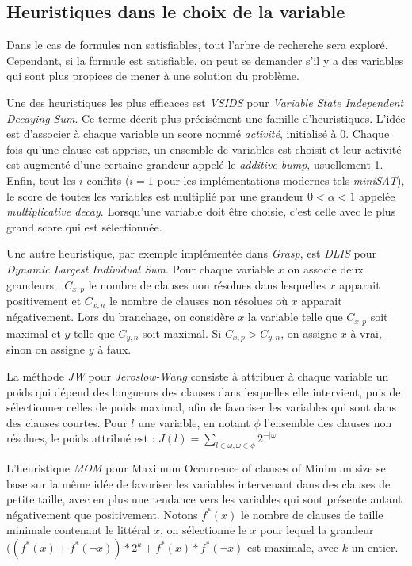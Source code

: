 \subsection{Heuristiques dans le choix de la variable}\label{decision}
Dans le cas de formules non satisfiables, tout l'arbre de recherche sera
exploré. Cependant, si la formule est satisfiable, on peut se demander s'il
y a des variables qui sont plus propices de mener à une solution du problème.

Une des heuristiques les plus efficaces est \emph{VSIDS} pour \emph{Variable
State Independent Decaying Sum}. Ce terme décrit plus précisément une famille
d'heuristiques. L'idée est d'associer à chaque variable un score nommé
\emph{activité}, initialisé à $0$. Chaque fois qu'une clause est apprise,
un ensemble de variables est choisit et leur activité est augmenté d'une
certaine grandeur appelé le \emph{additive bump}, usuellement 1. Enfin, tout
les $i$ conflits ($i=1$ pour les implémentations modernes tels \emph{miniSAT}),
le score de toutes les variables est multiplié par une grandeur
$0 < \alpha < 1$ appelée \emph{multiplicative decay}. Lorsqu'une variable doit
être choisie, c'est celle avec le plus grand score qui est sélectionnée.

Une autre heuristique, par exemple implémentée dans \emph{Grasp}, est
\emph{DLIS} pour \emph{Dynamic Largest Individual Sum}. Pour chaque variable
$x$ on associe deux grandeurs : $C_{x,p}$ le nombre de clauses non résolues
dans lesquelles $x$ apparait positivement et $C_{x,n}$ le nombre de clauses non
résolues où $x$ apparait négativement. Lors du branchage, on considère $x$ la
variable telle que $C_{x,p}$ soit maximal et $y$ telle que $C_{y,n}$ soit
maximal. Si $C_{x,p} > C_{y,n}$, on assigne $x$ à vrai, sinon on assigne $y$ à
faux.

La méthode \emph{JW} pour \emph{Jeroslow-Wang} consiste à attribuer à chaque
variable un poids qui dépend des longueurs des clauses dans lesquelles elle
intervient, puis de sélectionner celles de poids maximal, afin de favoriser
les variables qui sont dans des clauses courtes. Pour $l$ une variable, en
notant $\phi$ l'ensemble des clauses non résolues, le poids attribué est :
$J(l) = \sum_{l\in\omega,\omega\in\phi} 2^{-|\omega|}$

L'heuristique \emph{MOM} pour {Maximum Occurrence of clauses of Minimum size}
se base sur la même idée de favoriser les variables intervenant dans des
clauses de petite taille, avec en plus une tendance vers les variables qui
sont présente autant négativement que positivement. Notons $f^*(x)$ le nombre
de clauses de taille minimale contenant le littéral $x$, on sélectionne le $x$
pour lequel la grandeur $((f^*(x) + f^*(\neg x)) * 2^k + f^*(x)*f^*(\neg x)$
est maximale, avec $k$ un entier.

